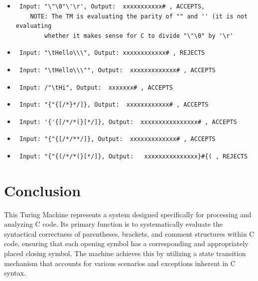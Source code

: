 \documentclass{article}
\begin{document}
\begin{itemize}
    \item \begin{verbatim} Input: "\"\0"\'\r', Output:  xxxxxxxxxxx# , ACCEPTS, 
    NOTE: The TM is evaluating the parity of "" and '' (it is not evaluating 
        whether it makes sense for C to divide "\"\0" by '\r' \end{verbatim} 
    \item \begin{verbatim} Input: "\tHello\\\", Output: xxxxxxxxxxxx# , REJECTS \end{verbatim}
    \item \begin{verbatim} Input: "\tHello\\\"", Output:  xxxxxxxxxxxxx# , ACCEPTS \end{verbatim}
    \item \begin{verbatim} Input: /"\tHi", Output:  xxxxxxx# , ACCEPTS \end{verbatim}
    \item \begin{verbatim} Input: "{"{[/*}*/]}, Output:  xxxxxxxxxxxx# , ACCEPTS \end{verbatim}
    \item \begin{verbatim} Input: '{'{[/*/*(}[*/]}, Output:  xxxxxxxxxxxxxxxx# , ACCEPTS \end{verbatim} 
    \item \begin{verbatim} Input: "{"{[/*/**/]}, Output:  xxxxxxxxxxxxx# , ACCEPTS \end{verbatim}
    \item \begin{verbatim} Input: "{"{(/*/*(}[*/]}, Output:   xxxxxxxxxxxxxxx}#{( , REJECTS \end{verbatim}

\end{itemize}

\section{Conclusion}
This Turing Machine represents a system designed specifically for processing and analyzing C code. Its primary function is to systematically evaluate 
the syntactical correctness of parentheses, brackets, and comment structures within C code, ensuring that each opening symbol has a corresponding and 
appropriately placed closing symbol. The machine achieves this by utilizing a state transition mechanism that accounts for various scenarios and 
exceptions inherent in C syntax.
\end{document}
